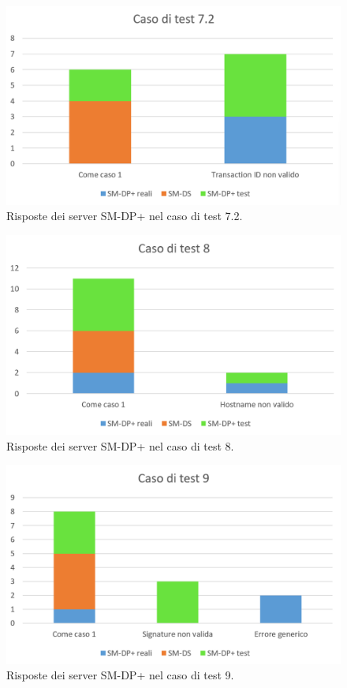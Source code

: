 \documentclass[10pt, oneside]{book}
\begin{document}
\begin{figure}
\includegraphics[width=\linewidth]{test-7-2.png}
\caption{Risposte dei server SM-DP+ nel caso di test 7.2.}
\label{fig:test-7-2}
\end{figure}
\begin{figure}
\includegraphics[width=\linewidth]{test-8.png}
\caption{Risposte dei server SM-DP+ nel caso di test 8.}
\label{fig:test-8}
\end{figure}
\begin{figure}
\includegraphics[width=\linewidth]{test-9.png}
\caption{Risposte dei server SM-DP+ nel caso di test 9.}
\label{fig:test-9}
\end{figure}
\end{document}
